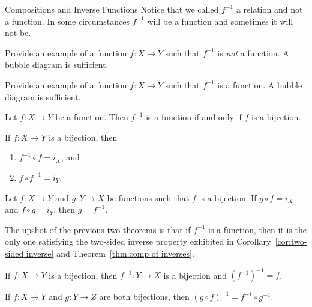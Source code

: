 \begin{section}{Compositions and Inverse Functions}
Notice that we called $f^{-1}$ a relation and not a function.  In some circumstances $f^{-1}$ will be a function and sometimes it will not be.

\begin{problem}
Provide an example of a function $f:X\to Y$ such that $f^{-1}$ is \emph{not} a function.  A bubble diagram is sufficient.
\end{problem}

\begin{problem}
Provide an example of a function $f:X\to Y$ such that $f^{-1}$ is a function. A bubble diagram is sufficient.
\end{problem}

\begin{theorem}
Let $f:X\to Y$ be a function.  Then $f^{-1}$ is a function if and only if $f$ is a bijection.
\end{theorem}

\begin{theorem}\label{thm:comp of inverses}
If $f:X\to Y$ is a bijection, then
\begin{enumerate}[label=\textrm{(\alph*)}]
\item $f^{-1}\circ f=i_X$, and
\item $f\circ f^{-1}=i_Y$.
\end{enumerate}
\end{theorem}

\begin{theorem}\label{thm:unique inverse}
Let $f:X\to Y$ and $g:Y\to X$ be functions such that $f$ is a bijection.  If $g\circ f=i_X$ and $f\circ g=i_Y$, then $g=f^{-1}$.
\end{theorem}

The upshot of the previous two theorems is that if $f^{-1}$ is a function, then it is the only one satisfying the two-sided inverse property exhibited in Corollary~\ref{cor:two-sided inverse} and Theorem~\ref{thm:comp of inverses}. %

\begin{theorem}
If $f:X\to Y$ is a bijection, then $f^{-1}:Y\to X$ is a bijection and $(f^{-1})^{-1}=f$.
\end{theorem}

\begin{theorem}
If $f:X\to Y$ and $g:Y\to Z$ are both bijections, then $(g\circ f)^{-1}=f^{-1}\circ g^{-1}$.
\end{theorem}


\end{section}
